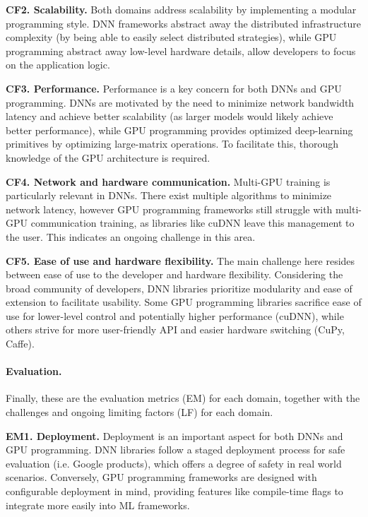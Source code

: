 \textbf{CF2. Scalability.}
Both domains address scalability by implementing a modular programming style. DNN frameworks abstract away
the distributed infrastructure complexity (by being able to easily select distributed strategies), while
GPU programming abstract away low-level hardware details, allow developers to focus on the application logic.

\textbf{CF3. Performance.}
Performance is a key concern for both DNNs and GPU programming. DNNs are
motivated by the need to minimize network bandwidth latency and achieve better scalability (as larger
models would likely achieve better performance), while GPU programming provides optimized deep-learning
primitives by optimizing large-matrix operations. To facilitate this, thorough knowledge of the GPU
architecture is required.





\textbf{CF4. Network and hardware communication.}
Multi-GPU training is particularly relevant in DNNs. There exist multiple algorithms to minimize
network latency, however GPU programming frameworks still struggle with multi-GPU communication
training, as libraries like cuDNN leave this management to the user. This indicates an ongoing challenge
in this area.

\textbf{CF5. Ease of use and hardware flexibility.}
The main challenge here resides between ease of use to the developer and hardware flexibility.
Considering the broad community of developers, DNN libraries prioritize modularity and ease of
extension to facilitate usability. Some GPU programming libraries sacrifice ease of use for lower-level control
and potentially higher performance (cuDNN), while others strive for more user-friendly API and easier
hardware switching (CuPy, Caffe).
\paragraph{Evaluation.}
Finally, these are the evaluation metrics (EM) for each domain, together with the challenges and
ongoing limiting factors (LF) for each domain.

\textbf{EM1. Deployment.}
Deployment is an important aspect for both DNNs and GPU programming. DNN libraries follow a staged
deployment process for safe evaluation (i.e. Google products), which offers a degree of safety in
real world scenarios. Conversely, GPU programming frameworks are designed with configurable deployment
in mind, providing features like compile-time flags to integrate more easily into ML frameworks.

